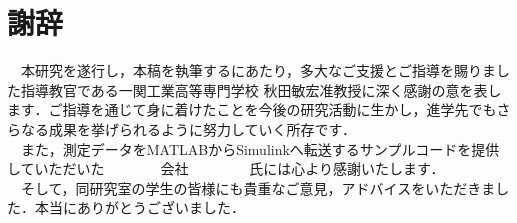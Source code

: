 \chapter*{謝辞}
　本研究を遂行し，本稿を執筆するにあたり，多大なご支援とご指導を賜りました指導教官である一関工業高等専門学校 秋田敏宏准教授に深く感謝の意を表します．ご指導を通じて身に着けたことを今後の研究活動に生かし，進学先でもさらなる成果を挙げられるように努力していく所存です．\\
　また，測定データをMATLABからSimulinkへ転送するサンプルコードを提供していただいた　　　　会社 　　　　氏には心より感謝いたします．\\
　そして，同研究室の学生の皆様にも貴重なご意見，アドバイスをいただきました．本当にありがとうございました．
